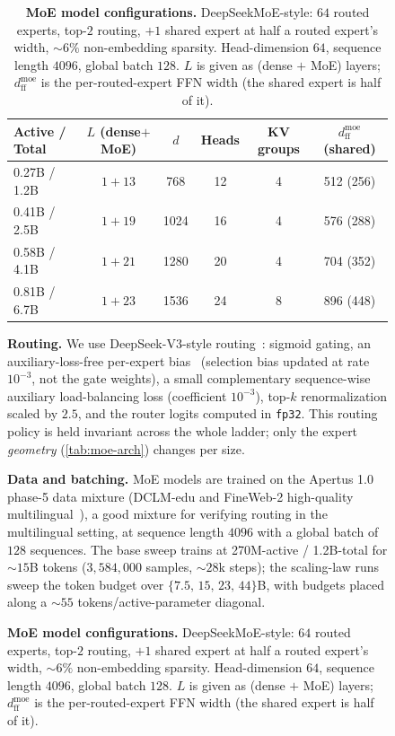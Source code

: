 \documentclass[10pt]{article} %
\begin{document}
\begin{figure}[t]
\begin{table}[t]
\centering
\small
\caption{\textbf{MoE model configurations.} DeepSeekMoE-style: $64$ routed experts, top-$2$ routing, $+1$ shared expert at half a routed expert's width, $\sim$$6\%$ non-embedding sparsity. Head-dimension $64$, sequence length $4096$, global batch $128$. $L$ is given as (dense $+$ MoE) layers; $d_{\text{ff}}^{\text{moe}}$ is the per-routed-expert FFN width (the shared expert is half of it).}
\label{tab:moe-arch}
\begin{tabular}{lccccc}
\toprule
Active / Total & $L$ (dense$+$MoE) & $d$ & Heads & KV groups & $d_{\text{ff}}^{\text{moe}}$ (shared) \\
\midrule
0.27B / 1.2B  & $1+13$ & 768  & 12 & 4 & 512 (256) \\
0.41B / 2.5B  & $1+19$ & 1024 & 16 & 4 & 576 (288) \\
0.58B / 4.1B  & $1+21$ & 1280 & 20 & 4 & 704 (352) \\
0.81B / 6.7B  & $1+23$ & 1536 & 24 & 8 & 896 (448) \\
\bottomrule
\end{tabular}
\end{table}

\textbf{Routing.} We use DeepSeek-V3-style routing~\citep{deepseekai2024v3}: sigmoid gating, an auxiliary-loss-free per-expert bias~\citep{wang2024auxlossfree} (selection bias updated at rate $10^{-3}$, not the gate weights), a small complementary sequence-wise auxiliary load-balancing loss (coefficient $10^{-3}$), top-$k$ renormalization scaled by $2.5$, and the router logits computed in \texttt{fp32}. This routing policy is held invariant across the whole ladder; only the expert \emph{geometry} (\autoref{tab:moe-arch}) changes per size.

\textbf{Data and batching.} MoE models are trained on the Apertus 1.0~\citep{swissai2025apertus} phase-5 data mixture (DCLM-edu and FineWeb-2 high-quality multilingual~\citep{messmer-etal-2025-enhancing}), a good mixture for verifying routing in the multilingual setting, at sequence length $4096$ with a global batch of $128$ sequences. The base sweep trains at 270M-active / 1.2B-total for $\sim$$15$B tokens ($3{,}584{,}000$ samples, $\sim$$28$k steps); the scaling-law runs sweep the token budget over $\{7.5,\,15,\,23,\,44\}$B, with budgets placed along a $\sim$$55$ tokens/active-parameter diagonal.


\end{figure}
\end{document}
